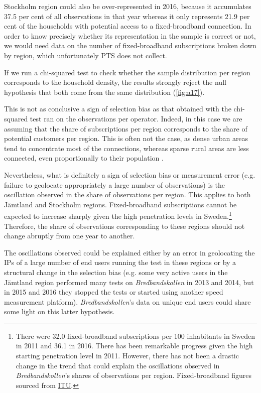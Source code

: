 \documentclass[12pt]{article}
\begin{document}
Stockholm region could also be over-represented in 2016, because it accumulates 37.5 per cent of all observations in that year whereas it only represents 21.9 per cent of the households with potential access to a fixed-broadband connection. In order to know precisely whether its representation in the sample is correct or not, we would need data on the number of fixed-broadband subscriptions broken down by region, which unfortunately PTS does not collect.

If we run a chi-squared test to check whether the sample distribution per region corresponds to the household density, the results strongly reject the null hypothesis that both come from the same distribution (\autoref{fig:a17}). 

This is not as conclusive a sign of selection bias as that obtained with the chi-squared test ran on the observations per operator. Indeed, in this case we are assuming that the share of subscriptions per region corresponds to the share of potential customers per region. This is often not the case, as dense urban areas tend to concentrate most of the connections, whereas sparse rural areas are less connected, even proportionally to their population \citep[see chapter 6 in][]{misr2016}. 

Nevertheless, what is definitely a sign of selection bias or measurement error (e.g. failure to geolocate appropriately a large number of observations) is the oscillation observed in the share of observations per region. This applies to both Jämtland and Stockholm regions. Fixed-broadband subscriptions cannot be expected to increase sharply given the high penetration levels in Sweden.\footnote{There were 32.0 fixed-broadband subscriptions per 100 inhabitants in Sweden in 2011 and 36.1 in 2016. There has been remarkable progress given the high starting penetration level in 2011. However, there has not been a drastic change in the trend that could explain the oscillations observed in \textit{Bredbandskollen}'s shares of observations per region. Fixed-broadband figures sourced from \href{http://www.itu.int/en/ITU-D/Statistics/Pages/stat/default.aspx}{ITU}.} Therefore, the share of observations corresponding to these regions should not change abruptly from one year to another.

The oscillations observed could be explained either by an error in geolocating the IPs of a large number of end users running the test in these regions or by a structural change in the selection bias (e.g. some very active users in the Jämtland region performed many tests on \textit{Bredbandskollen} in 2013 and 2014, but in 2015 and 2016 they stopped the tests or started using another speed measurement platform). \textit{Bredbandskollen}'s data on unique end users could share some light on this latter hypothesis.               
\end{document}
